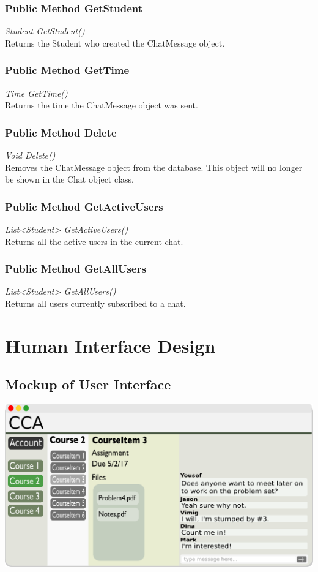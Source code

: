 \documentclass[16pt]{scrreprt}
\begin{document}
\subsection{Public Method GetStudent}
\textit{Student GetStudent()} \\
Returns the Student who created the ChatMessage object.

\subsection{Public Method GetTime}
\textit{Time GetTime()} \\
Returns the time the ChatMessage object was sent.

\subsection{Public Method Delete}
\textit{Void Delete()} \\
Removes the ChatMessage object from the database. This object will no longer be shown in the Chat object class.

\subsection{Public Method GetActiveUsers}
\textit{List<Student> GetActiveUsers()} \\
Returns all the active users in the current chat. 

\subsection{Public Method GetAllUsers}
\textit{List<Student> GetAllUsers()} \\
Returns all users currently subscribed to a chat. 


\chapter{Human Interface Design}

\section{Mockup of User Interface}

\includegraphics[width=1.0\textwidth]{diagrams/UI_Mockup.png}
\end{document}
